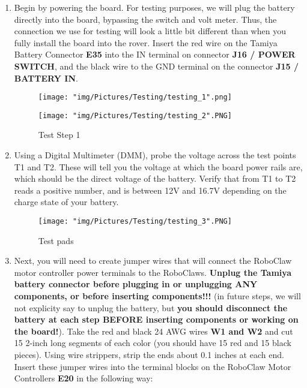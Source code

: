 \documentclass[12pt]{article}
\begin{document}
\begin{enumerate}

\item Begin by powering the board. For testing purposes, we will plug the battery directly into the board, bypassing the switch and volt meter.  Thus, the connection we use for testing will look a little bit different than when you fully install the board into the rover. Insert the red wire on the Tamiya Battery Connector \textbf{E35} into the IN terminal on connector \textbf{J16 / POWER SWITCH}, and the black wire to the GND terminal on the connector \textbf{J15 / BATTERY IN}.

\begin{figure}[H]
  \centering
  \begin{minipage}[b]{0.45\textwidth}
    \texttt{[image: "img/Pictures/Testing/testing\_1".png]}
  \end{minipage}
  \hfill
  \begin{minipage}[b]{0.45\textwidth}
    \texttt{[image: "img/Pictures/Testing/testing\_2".PNG]}
  \end{minipage}
  \caption{Test Step 1}
  \label{test_1}
\end{figure}

\item Using a Digital Multimeter (DMM), probe the voltage across the test points T1 and T2. These will tell you the voltage at which the board power rails are, which should be the direct voltage of the battery. Verify that from T1 to T2 reads a positive number, and is between 12V and 16.7V depending on the charge state of your battery. 

\begin{figure}[H]
  \centering
    \texttt{[image: "img/Pictures/Testing/testing\_3".PNG]}
  \caption{Test pads}
  \label{test_pads_1}
\end{figure}

\item Next, you will need to create jumper wires that will connect the RoboClaw motor controller power terminals to the RoboClaws. \textbf{Unplug the Tamiya battery connector before plugging in or unplugging ANY components, or before inserting components!!!}  (in future steps, we will not explicity say to unplug the battery, but \textbf{you should disconnect the battery at each step BEFORE inserting components or working on the board!}). Take the red and black 24 AWG wires \textbf{W1 and W2} and cut 15 2-inch long segments of each color (you should have 15 red and 15 black pieces). Using wire strippers, strip the ends about 0.1 inches at each end. Insert these jumper wires into the terminal blocks on the RoboClaw Motor Controllers \textbf{E20} in the following way:


\end{enumerate}
\end{document}
